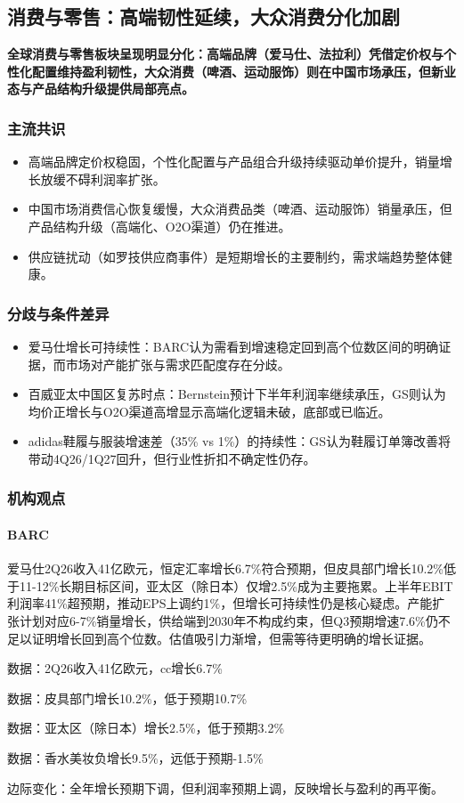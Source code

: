 \documentclass[11pt]{ctexart}
\begin{document}
\subsection{消费与零售：高端韧性延续，大众消费分化加剧}
\textbf{全球消费与零售板块呈现明显分化：高端品牌（爱马仕、法拉利）凭借定价权与个性化配置维持盈利韧性，大众消费（啤酒、运动服饰）则在中国市场承压，但新业态与产品结构升级提供局部亮点。}
\subsubsection*{主流共识}
\begin{itemize}
  \item 高端品牌定价权稳固，个性化配置与产品组合升级持续驱动单价提升，销量增长放缓不碍利润率扩张。
  \item 中国市场消费信心恢复缓慢，大众消费品类（啤酒、运动服饰）销量承压，但产品结构升级（高端化、O2O渠道）仍在推进。
  \item 供应链扰动（如罗技供应商事件）是短期增长的主要制约，需求端趋势整体健康。
\end{itemize}
\subsubsection*{分歧与条件差异}
\begin{itemize}
  \item 爱马仕增长可持续性：BARC认为需看到增速稳定回到高个位数区间的明确证据，而市场对产能扩张与需求匹配度存在分歧。
  \item 百威亚太中国区复苏时点：Bernstein预计下半年利润率继续承压，GS则认为均价正增长与O2O渠道高增显示高端化逻辑未破，底部或已临近。
  \item adidas鞋履与服装增速差（35\% vs 1\%）的持续性：GS认为鞋履订单簿改善将带动4Q26/1Q27回升，但行业性折扣不确定性仍存。
\end{itemize}
\subsubsection*{机构观点}
\paragraph{BARC} 爱马仕2Q26收入41亿欧元，恒定汇率增长6.7\%符合预期，但皮具部门增长10.2\%低于11-12\%长期目标区间，亚太区（除日本）仅增2.5\%成为主要拖累。上半年EBIT利润率41\%超预期，推动EPS上调约1\%，但增长可持续性仍是核心疑虑。产能扩张计划对应6-7\%销量增长，供给端到2030年不构成约束，但Q3预期增速7.6\%仍不足以证明增长回到高个位数。估值吸引力渐增，但需等待更明确的增长证据。
{\small\color{refgray}数据：2Q26收入41亿欧元，cc增长6.7\%\par}
{\small\color{refgray}数据：皮具部门增长10.2\%，低于预期10.7\%\par}
{\small\color{refgray}数据：亚太区（除日本）增长2.5\%，低于预期3.2\%\par}
{\small\color{refgray}数据：香水美妆负增长9.5\%，远低于预期-1.5\%\par}
{\small\color{refgray}边际变化：全年增长预期下调，但利润率预期上调，反映增长与盈利的再平衡。\par}
\end{document}
